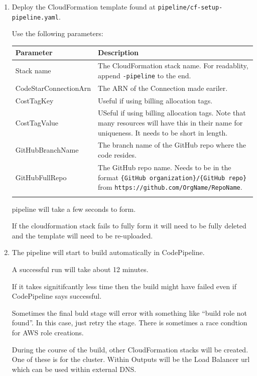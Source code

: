 \begin{enumerate}
\item Deploy the CloudFormation template found at \texttt{pipeline/cf-setup-pipeline.yaml}.

Use the following parameters:

\bigskip\noindent
\begin{tabular}{p{}p{}}
\toprule
Parameter & Description \\
\hline
Stack name & The CloudFormation stack name. For readablity, append \texttt{-pipeline} to the end. \\
CodeStarConnectionArn & The ARN of the Connection made eariler. \\
CostTagKey & Useful if using billing allocation tags. \\
CostTagValue & USeful if using billing allocation tags. Note that many resources will have this in their name for uniqueness. It needs to be short in length. \\
GitHubBranchName & The branch name of the GitHub repo where the code resides. \\
GitHubFullRepo & The GitHub repo name. Needs to be in the format \texttt{\{GitHub organization\}/\{GitHub repo\}} from \texttt{https://github.com/OrgName/RepoName}. \\
 &  \\
\bottomrule
\end{tabular}

\bigskipThe pipeline will take a few seconds to form.

If the cloudformation stack fails to fully form it will need to be fully deleted and the template will need to be re-uploaded.


\item The pipeline will start to build automatically in CodePipeline.

A successful run will take about 12 minutes.

If it takes signitifcantly less time then the build might have failed even if CodePipeline says successful.

Sometimes the final buld stage will error with something like ``build role not found''. In this case, just retry the stage. There is sometimes a race condtion for AWS role creations.

During the course of the build, other CloudFormation stacks will be created. One of these is for the cluster. Within Outputs will be the Load Balancer url which can be used within external DNS.



\end{enumerate}
